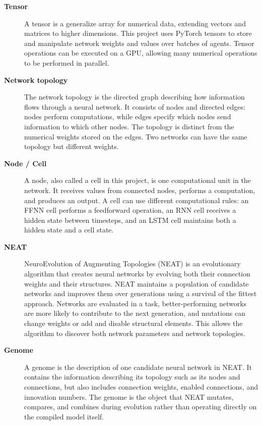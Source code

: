 \documentclass[11pt]{article}
\begin{document}
\begin{description}

    \item[\textbf{Tensor}]
    A tensor is a generalize array for numerical data, extending vectors and matrices to higher dimensions. This project uses PyTorch tensors
    to store and manipulate network weights and values over batches of agents. Tensor operations can be executed on a GPU, allowing
    many numerical operations to be performed in parallel.

    \item[\textbf{Network topology}]
    The network topology is the directed graph describing how information
    flows through a neural network. It consists of nodes and directed
    edges: nodes perform computations, while edges specify which nodes
    send information to which other nodes. The topology is distinct from
    the numerical weights stored on the edges. Two networks can have the
    same topology but different weights.

    \item[\textbf{Node / Cell}]
    A node, also called a cell in this project, is one computational unit
    in the network. It receives values from connected nodes, performs a
    computation, and produces an output. A cell can use different
    computational rules: an FFNN cell performs a feedforward operation,
    an RNN cell receives a hidden state between timesteps, and an LSTM
    cell maintains both a hidden state and a cell state.


    \item[\textbf{NEAT}]
    NeuroEvolution of Augmenting Topologies (NEAT) is an evolutionary
    algorithm that creates neural networks by evolving both their
    connection weights and their structures. NEAT maintains a population of candidate networks and
    improves them over generations using a survival of the fittest approach. Networks are evaluated in a task,
    better-performing networks are more likely to contribute to the
    next generation, and mutations can change weights or add and disable
    structural elements. This allows the algorithm to discover both
    network parameters and network topologies.

    \item[\textbf{Genome}]
    A genome is the description of one candidate neural
    network in NEAT. It contains the information describing its topology such as its nodes and
    connections, but also includes connection
    weights, enabled connections, and innovation numbers. The genome is
    the object that NEAT mutates, compares, and combines during evolution rather than operating directly on the compiled model itself.


\end{description}
\end{document}
